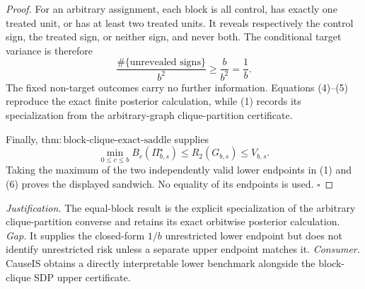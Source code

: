 \documentclass{article}
\begin{document}
\begin{proof}
For an arbitrary assignment, each block is all control, has exactly one treated unit, or has at least two treated units. It reveals respectively the control sign, the treated sign, or neither sign, and never both. The conditional target variance is therefore
\[
\frac{\#\{\text{unrevealed signs}\}}{b^2}\geq\frac b{b^2}=\frac1b.
\tag{5}
\]
The fixed non-target outcomes carry no further information. Equations (4)--(5) reproduce the exact finite posterior calculation, while (1) records its specialization from the arbitrary-graph clique-partition certificate.

Finally, \(\mathrm{thm{:}block\text{-}clique\text{-}exact\text{-}saddle}\) supplies
\[
\min_{0\leq c\leq b}B_c(\Pi_{b,s}^{\star})
\leq R_2(G_{b,s})\leq V_{b,s}.
\tag{6}
\]
Taking the maximum of the two independently valid lower endpoints in (1) and (6) proves the displayed sandwich. No equality of its endpoints is used. \(\square\)
\end{proof}
\par\smallskip\noindent \textit{Justification.} The equal-block result is the explicit specialization of the arbitrary clique-partition converse and retains its exact orbitwise posterior calculation. \textit{Gap.} It supplies the closed-form \(1/b\) unrestricted lower endpoint but does not identify unrestricted risk unless a separate upper endpoint matches it. \textit{Consumer.} CauseIS obtains a directly interpretable lower benchmark alongside the block-clique SDP upper certificate.
\end{document}
